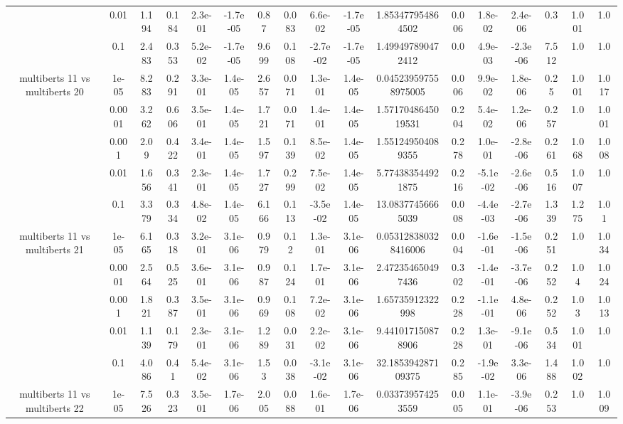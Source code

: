 \begin{tabular}{|c|c|c|c|c|c|c|c|c|c|c|c|c|c|c|c|c|}
 & 0.01 & 1.194 & 0.184 & 2.3e-01 & -1.7e-05 & 0.87 & 0.083 & 6.6e-02 & -1.7e-05 & 1.853477954864502 & 0.006 & 1.8e-02 & 2.4e-06 & 0.3 & 1.001 & 1.0 \\
 & 0.1 & 2.483 & 0.353 & 5.2e-02 & -1.7e-05 & 9.699 & 0.108 & -2.7e-02 & -1.7e-05 & 1.499497890472412 & 0.0 & 4.9e-03 & -2.3e-06 & 7.512 & 1.0 & 1.0 \\
\hline
\multirow{5}{*}{multiberts 11 vs multiberts 20} & 1e-05 & 8.283 & 0.291 & 3.3e-01 & 1.4e-05 & 2.657 & 0.071 & 1.3e-01 & 1.4e-05 & 0.045239597558975005 & 0.006 & 9.9e-02 & 1.8e-06 & 0.25 & 1.001 & 1.017 \\
 & 0.0001 & 3.262 & 0.606 & 3.5e-01 & 1.4e-05 & 1.721 & 0.071 & 1.4e-01 & 1.4e-05 & 1.5717048645019531 & 0.204 & 5.4e-02 & 1.2e-06 & 0.257 & 1.0 & 1.001 \\
 & 0.001 & 2.09 & 0.422 & 3.4e-01 & 1.4e-05 & 1.597 & 0.139 & 8.5e-02 & 1.4e-05 & 1.551249504089355 & 0.278 & 1.0e-01 & -2.8e-06 & 0.261 & 1.068 & 1.008 \\
 & 0.01 & 1.656 & 0.341 & 2.3e-01 & 1.4e-05 & 1.727 & 0.299 & 7.5e-02 & 1.4e-05 & 5.774383544921875 & 0.216 & -5.1e-02 & -2.6e-06 & 0.516 & 1.007 & 1.0 \\
 & 0.1 & 3.379 & 0.334 & 4.8e-02 & 1.4e-05 & 6.166 & 0.113 & -3.5e-02 & 1.4e-05 & 13.08377456665039 & 0.008 & -4.4e-03 & -2.7e-06 & 1.339 & 1.275 & 1.01 \\
\hline
\multirow{5}{*}{multiberts 11 vs multiberts 21} & 1e-05 & 6.165 & 0.318 & 3.2e-01 & 3.1e-06 & 0.979 & 0.12 & 1.3e-01 & 3.1e-06 & 0.053128380328416006 & 0.004 & -1.6e-01 & -1.5e-06 & 0.251 & 1.0 & 1.034 \\
 & 0.0001 & 2.564 & 0.525 & 3.6e-01 & 3.1e-06 & 0.987 & 0.124 & 1.7e-01 & 3.1e-06 & 2.472354650497436 & 0.302 & -1.4e-01 & -3.7e-06 & 0.252 & 1.04 & 1.024 \\
 & 0.001 & 1.821 & 0.387 & 3.5e-01 & 3.1e-06 & 0.969 & 0.108 & 7.2e-02 & 3.1e-06 & 1.65735912322998 & 0.228 & -1.1e-01 & 4.8e-06 & 0.252 & 1.03 & 1.013 \\
 & 0.01 & 1.139 & 0.179 & 2.3e-01 & 3.1e-06 & 1.289 & 0.031 & 2.2e-02 & 3.1e-06 & 9.441017150878906 & 0.228 & 1.3e-01 & -9.1e-06 & 0.534 & 1.001 & 1.0 \\
 & 0.1 & 4.086 & 0.41 & 5.4e-02 & 3.1e-06 & 1.53 & 0.038 & -3.1e-02 & 3.1e-06 & 32.185394287109375 & 0.285 & -1.9e-02 & 3.3e-06 & 1.488 & 1.002 & 1.0 \\
\hline
\multirow{5}{*}{multiberts 11 vs multiberts 22} & 1e-05 & 7.526 & 0.323 & 3.5e-01 & 1.7e-06 & 2.005 & 0.088 & 1.6e-01 & 1.7e-06 & 0.033739574253559 & 0.005 & 1.1e-01 & -3.9e-06 & 0.253 & 1.0 & 1.009 \\

\end{tabular}
